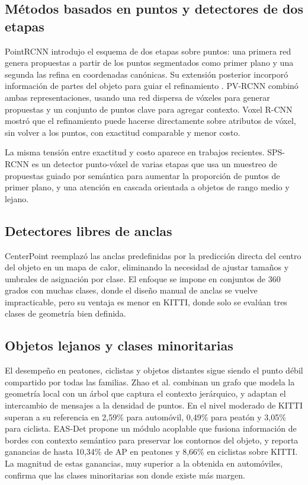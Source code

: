 \documentclass[11pt,letterpaper]{article}
\begin{document}
\subsection{Métodos basados en puntos y detectores de dos etapas}

PointRCNN \cite{shi2019} introdujo el esquema de dos etapas sobre puntos: una primera red genera propuestas a partir de los puntos segmentados como primer plano y una segunda las refina en coordenadas canónicas. Su extensión posterior incorporó información de partes del objeto para guiar el refinamiento \cite{shi2021}. PV-RCNN \cite{shi2020} combinó ambas representaciones, usando una red dispersa de vóxeles para generar propuestas y un conjunto de puntos clave para agregar contexto. Voxel R-CNN \cite{deng2021} mostró que el refinamiento puede hacerse directamente sobre atributos de vóxel, sin volver a los puntos, con exactitud comparable y menor costo.

La misma tensión entre exactitud y costo aparece en trabajos recientes. SPS-RCNN \cite{xu2025} es un detector punto-vóxel de varias etapas que usa un muestreo de propuestas guiado por semántica para aumentar la proporción de puntos de primer plano, y una atención en cascada orientada a objetos de rango medio y lejano.

\subsection{Detectores libres de anclas}

CenterPoint \cite{yin2021} reemplazó las anclas predefinidas por la predicción directa del centro del objeto en un mapa de calor, eliminando la necesidad de ajustar tamaños y umbrales de asignación por clase. El enfoque se impone en conjuntos de 360 grados con muchas clases, donde el diseño manual de anclas se vuelve impracticable, pero su ventaja es menor en KITTI, donde solo se evalúan tres clases de geometría bien definida.

\subsection{Objetos lejanos y clases minoritarias}

El desempeño en peatones, ciclistas y objetos distantes sigue siendo el punto débil compartido por todas las familias. Zhao et al. \cite{zhao2025} combinan un grafo que modela la geometría local con un árbol que captura el contexto jerárquico, y adaptan el intercambio de mensajes a la densidad de puntos. En el nivel moderado de KITTI superan a su referencia en 2,59\% para automóvil, 0,49\% para peatón y 3,05\% para ciclista. EAS-Det \cite{wang2025eas} propone un módulo acoplable que fusiona información de bordes con contexto semántico para preservar los contornos del objeto, y reporta ganancias de hasta 10,34\% de AP en peatones y 8,66\% en ciclistas sobre KITTI. La magnitud de estas ganancias, muy superior a la obtenida en automóviles, confirma que las clases minoritarias son donde existe más margen.
\end{document}
